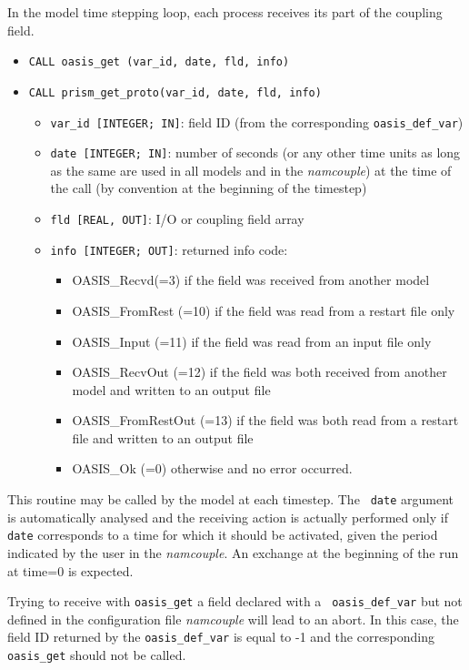 In the model time stepping loop, each process receives its part of the
coupling field.

\begin{itemize}
 
\item {\tt CALL oasis\_get (var\_id, date, fld, info)}
\item {\tt CALL prism\_get\_proto(var\_id, date, fld, info)}
  \begin{itemize}
  \item {\tt var\_id [INTEGER; IN]}: field ID (from the corresponding
    {\tt oasis\_def\_var})
  \item {\tt date [INTEGER; IN]}: number of seconds (or any other time
    units as long as the same are used in all models and in the {\it
      namcouple}) at the time of the call (by convention at the
    beginning of the timestep)
  \item {\tt fld [REAL, OUT]}: I/O or coupling field array
  \item {\tt info [INTEGER; OUT]}: returned info code:
    \begin{itemize}
    \item OASIS\_Recvd(=3) if the field was received from another
      model
    \item OASIS\_FromRest (=10) if the field was read from a restart
      file only
    \item OASIS\_Input (=11) if the field was read from an input file
      only
    \item OASIS\_RecvOut (=12) if the field was both received from
      another model and written to an output file
    \item OASIS\_FromRestOut (=13) if the field was both read from a
      restart file and written to an output file
    \item OASIS\_Ok (=0) otherwise and no error occurred.
    \end{itemize}
  \end{itemize}
\end{itemize}

This routine may be called by the model at each timestep. The {\tt
  date} argument is automatically analysed and the receiving action is
actually performed only if {\tt date} corresponds to a time for which
it should be activated, given the period indicated by the user in the
{\it namcouple}. An exchange at the beginning of the run at time=0 is
expected.

Trying to receive with {\tt oasis\_get} a field declared with a {\tt
  oasis\_def\_var} but not defined in the configuration file {\it
  namcouple} will lead to an abort. In this case, the field ID
returned by the {\tt oasis\_def\_var} is equal to -1 and the
corresponding {\tt oasis\_get} should not be called.

